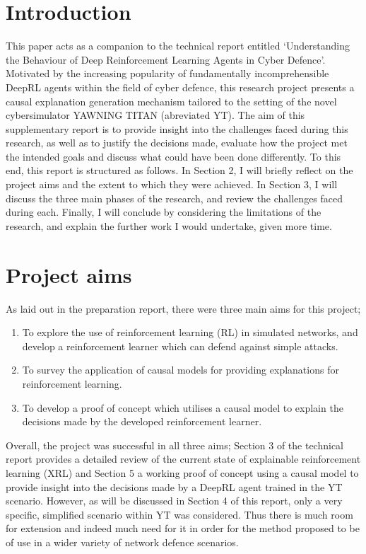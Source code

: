\documentclass{article}
\begin{document}
\section{Introduction}
This paper acts as a companion to the technical report entitled `Understanding the Behaviour of Deep Reinforcement Learning Agents in Cyber Defence'. Motivated by the increasing popularity of fundamentally incomprehensible DeepRL agents within the field of cyber defence, this research project presents a causal explanation generation mechanism tailored to the setting of the novel cybersimulator YAWNING TITAN \cite{inproceedings} (abreviated YT). The aim of this supplementary report is to provide insight into the challenges faced during this research, as well as to justify the decisions made, evaluate how the project met the intended goals and discuss what could have been done differently. To this end, this report is structured as follows. In Section 2, I will briefly reflect on the project aims and the extent to which they were achieved. In Section 3, I will discuss the three main phases of the research, and review the challenges faced during each. Finally, I will conclude by considering the limitations of the research, and explain the further work I would undertake, given more time. 

\section{Project aims}

As laid out in the preparation report, there were three main aims for this project;

\begin{enumerate}
    \item To explore the use of reinforcement learning (RL) in simulated networks, and develop a reinforcement learner which can defend against simple attacks.
    \item To survey the application of causal models for  providing explanations for reinforcement learning.
    \item To develop a proof of concept which utilises a causal model to explain the decisions made by the developed reinforcement learner. 
\end{enumerate}

\noindent Overall, the project was successful in all three aims; Section 3 of the technical report provides a detailed review of the current state of explainable reinforcement learning (XRL) and Section 5 a working proof of concept using a causal model to provide insight into the decisions made by a DeepRL agent trained in the YT scenario. However, as will be discussed in Section 4 of this report, only a very specific, simplified scenario within YT was considered. Thus there is much room for extension and indeed much need for it in order for the method proposed to be of use in a wider variety of network defence scenarios.  
\end{document}
